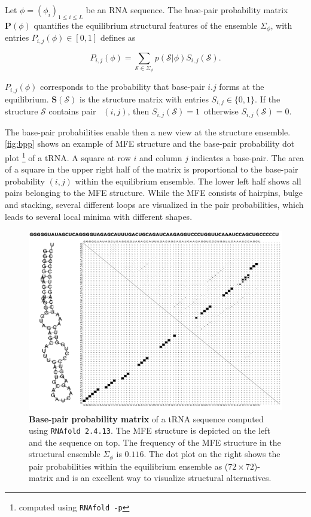\begin{mydef}
	\label{def:bp_probability}
	
	Let $\phi=(\phi_i)_{1\leq i \leq L} $ be an \ac{RNA} sequence. The base-pair probability matrix $\mathbf{P}(\phi)$ quantifies the equilibrium structural features of the ensemble $\Sigma_{\phi}$, with entries $P_{i,j}(\phi) \in [ 0,1]$ defines as 
	
	\begin{equation}
	P_{i,j}(\phi) = \sum_{\mathcal{S} \in \Sigma_{\phi}}{p(\mathcal{S}|\phi)S_{i,j}(\mathcal{S})}.
	\end{equation} 
	
	$P_{i,j}(\phi)$ corresponds to the probability that base-pair $i.j$ forms at the equilibrium. 
	\(\mathbf{S}(\mathcal{S})\) is the structure matrix with entries \(S_{i,j} \in  \{ 0, 1\}\). If the structure \(\mathcal{S}\) contains pair~ $(i ,j)$, then \(S_{i,j}(\mathcal{S}) = 1\)~otherwise \(S_{i,j}(\mathcal{S}) = 0\).
	
	The base-pair probabilities enable then a new view at the structure ensemble. \autoref{fig:bpp} shows an example of \ac{MFE} structure and the base-pair probability dot plot \footnote{computed using \texttt{RNAfold -p}} of a \ac{tRNA}. A square at row $i$ and column $j$ indicates a base-pair. The area of a square in the upper right half of the matrix is proportional to the base-pair probability $(i, j)$ within the equilibrium ensemble. The lower left half shows all pairs belonging to the \ac{MFE} structure. While the \ac{MFE} consists of hairpins, bulge and stacking, several different loops are visualized in the pair probabilities, which leads to several local minima with different shapes.
\end{mydef}
\begin{figure}[t!]
	\includegraphics[width=1.0 \linewidth]{../res/images/trna_bpp.pdf}
	\caption{\textbf{Base-pair probability matrix} of a \ac{tRNA} sequence computed using \texttt{RNAfold 2.4.13}. The \ac{MFE} structure is depicted on the left and the sequence on top. The frequency of the \ac{MFE} structure in the structural ensemble $\Sigma_{\phi}$ is $0.116$. The dot plot on the right shows the pair probabilities within the equilibrium ensemble as ($72\times72$)-matrix and is an excellent way to visualize structural alternatives.  } \label{fig:bpp}
\end{figure}

